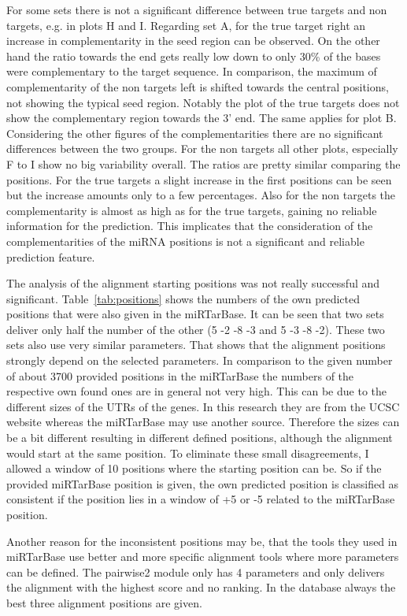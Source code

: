 \documentclass[12pt]{article}
\begin{document}
For some sets there is not a significant difference between true targets and non targets, e.g. in plots H and I. Regarding set A, for the true target right an increase in complementarity in the seed region can be observed. On the other hand the ratio towards the end gets really low down to only 30\% of the bases were complementary to the target sequence. In comparison, the maximum of complementarity of the non targets left is shifted towards the central positions, not showing the typical seed region. Notably the plot of the true targets does not show the complementary region towards the 3' end. The same applies for plot B. Considering the other figures of the complementarities there are no significant differences between the two groups. For the non targets all other plots, especially F to I show no big variability overall. The ratios are pretty similar comparing the positions. For the true targets a slight increase in the first positions can be seen but the increase amounts only to a few percentages.
Also for the non targets the complementarity is almost as high as for the true targets, gaining no reliable information for the prediction. This implicates that the consideration of the complementarities of the miRNA positions is not a significant and reliable prediction feature.

The analysis of the alignment starting positions was not really successful and significant. Table~\ref{tab:positions} shows the numbers of the own predicted positions that were also given in the miRTarBase. It can be seen that two sets deliver only half the number of the other (5 -2 -8 -3 and 5 -3 -8 -2). These two sets also use very similar parameters. That shows that the alignment positions strongly depend on the selected parameters. In comparison to the given number of about 3700 provided positions in the miRTarBase the numbers of the respective own found ones are in general not very high. This can be due to the different sizes of the UTRs of the genes. In this research they are from the UCSC website whereas the miRTarBase may use another source. Therefore the sizes can be a bit different resulting in different defined positions, although the alignment would start at the same position. To eliminate these small disagreements, I allowed a window of 10 positions where the starting position can be. So if the provided miRTarBase position is given, the own predicted position is classified as consistent if the position lies in a window of +5 or -5 related to the miRTarBase position. 

Another reason for the inconsistent positions may be, that the tools they used in miRTarBase use better and more specific alignment tools where more parameters can be defined. The pairwise2 module only has 4 parameters and only delivers the alignment with the highest score and no ranking. In the database always the best three alignment positions are given.  \\
\end{document}
